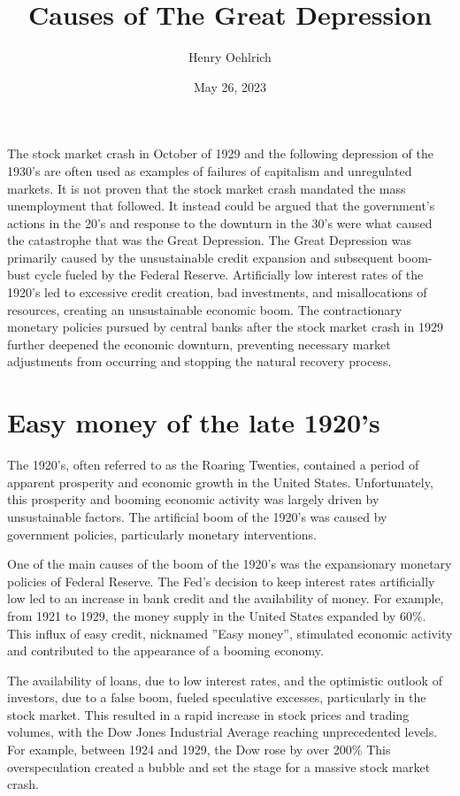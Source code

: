 \documentclass[12pt]{article}
\title{Causes of The Great Depression}
\author{Henry Oehlrich}
\date{May 26, 2023}
\begin{document}
\maketitle{}

The stock market crash in October of 1929 and the following depression of the
1930’s are often used as examples of failures of capitalism and unregulated
markets. It is not proven that the stock market crash mandated the mass
unemployment that followed. It instead could be argued that the government’s
actions in the 20’s and response to the downturn in the 30’s were what caused
the catastrophe that was the Great Depression. The Great Depression was
primarily caused by the unsustainable credit expansion and subsequent boom-bust
cycle fueled by the Federal Reserve. Artificially low interest rates of the
1920's led to excessive credit creation, bad investments, and misallocations of
resources, creating an unsustainable economic boom. The contractionary
monetary policies pursued by central banks after the stock market crash in 1929
further deepened the economic downturn, preventing necessary market adjustments
from occurring and stopping the natural recovery process.

\section{Easy money of the late 1920's}

The 1920's, often referred to as the Roaring Twenties, contained a period of
apparent prosperity and economic growth in the United States. Unfortunately,
this prosperity and booming economic activity was largely driven by
unsustainable factors. The artificial boom of the 1920's was caused by
government policies, particularly monetary interventions.

One of the main causes of the boom of the 1920's was the expansionary monetary
policies of Federal Reserve. The Fed’s decision to keep interest rates
artificially low led to an increase in bank credit and the availability of
money. For example, from 1921 to 1929, the money supply in the United States
expanded by 60\%\autocite{fredmoneysupply}. This influx of easy credit,
nicknamed ”Easy money”, stimulated economic activity and contributed to the
appearance of a booming economy.

The availability of loans, due to low interest rates, and the optimistic
outlook of investors, due to a false boom, fueled speculative excesses,
particularly in the stock market. This resulted in a rapid increase in stock
prices and trading volumes, with the Dow Jones Industrial Average reaching
unprecedented levels. For example, between 1924 and 1929, the Dow rose by over
200\%\autocite{macrotrendsdow} This overspeculation created a bubble and set
the stage for a massive stock market crash.
\end{document}
